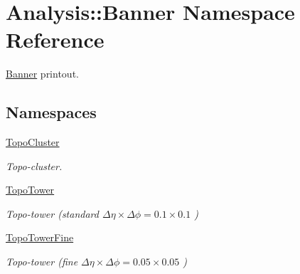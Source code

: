 \hypertarget{namespaceAnalysis_1_1Banner}{}\section{Analysis\+:\+:Banner Namespace Reference}
\label{namespaceAnalysis_1_1Banner}


\hyperlink{namespaceAnalysis_1_1Banner}{Banner} printout.  


\subsection*{Namespaces}
\begin{DoxyCompactItemize}
\item 
 \hyperlink{namespaceAnalysis_1_1Banner_1_1TopoCluster}{Topo\+Cluster}
\begin{DoxyCompactList}\small\item\em Topo-\/cluster. \end{DoxyCompactList}\item 
 \hyperlink{namespaceAnalysis_1_1Banner_1_1TopoTower}{Topo\+Tower}
\begin{DoxyCompactList}\small\item\em Topo-\/tower (standard $ \Delta\eta\times\Delta\phi = 0.1\times 0.1 $ ) \end{DoxyCompactList}\item 
 \hyperlink{namespaceAnalysis_1_1Banner_1_1TopoTowerFine}{Topo\+Tower\+Fine}
\begin{DoxyCompactList}\small\item\em Topo-\/tower (fine $ \Delta\eta\times\Delta\phi = 0.05\times 0.05 $ ) \end{DoxyCompactList}\end{DoxyCompactItemize}
